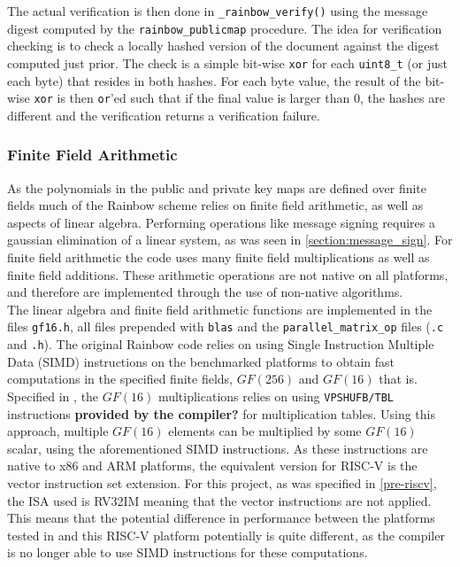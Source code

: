 The actual verification is then done in \texttt{\_rainbow\_verify()} using the message digest computed by the \texttt{rainbow\_publicmap} procedure. The idea for verification checking is to check a locally hashed version of the document against the digest computed just prior. The check is a simple bit-wise \texttt{xor} for each \texttt{uint8\_t} (or just each byte) that resides in both hashes. For each byte value, the result of the bit-wise \texttt{xor} is then \texttt{or}'ed such that if the final value is larger than 0, the hashes are different and the verification returns a verification failure.

\subsubsection{Finite Field Arithmetic}
As the polynomials in the public and private key maps are defined over finite fields much of the Rainbow scheme relies on finite field arithmetic, as well as aspects of linear algebra. Performing operations like message signing requires a gaussian elimination of a linear system, as was seen in \cref{section:message_sign}. For finite field arithmetic the code uses many finite field multiplications as well as finite field additions. These arithmetic operations are not native on all platforms, and therefore are implemented through the use of non-native algorithms.\medskip\\
The linear algebra and finite field arithmetic functions are implemented in the files \texttt{gf16.h}, all files prepended with \texttt{blas} and the \texttt{parallel\_matrix\_op} files (\texttt{.c} and \texttt{.h}). The original Rainbow code relies on using Single Instruction Multiple Data (SIMD) instructions on the benchmarked platforms to obtain fast computations in the specified finite fields, $GF(256)$ and $GF(16)$ that is.
\medskip\\
Specified in \cite{rainbownist}, the $GF(16)$ multiplications relies on using \texttt{VPSHUFB/TBL} instructions \textbf{provided by the compiler?} for multiplication tables. Using this approach, multiple $GF(16)$ elements can be multiplied by some $GF(16)$ scalar, using the aforementioned SIMD instructions. As these instructions are native to x86 and ARM platforms, the equivalent version for RISC-V is the vector instruction set extension. For this project, as was specified in \cref{pre-riscv}, the ISA used is RV32IM meaning that the vector instructions are not applied. This means that the potential difference in performance between the platforms tested in \cite{rainbownist} and this RISC-V platform potentially is quite different, as the compiler is no longer able to use SIMD instructions for these computations.
